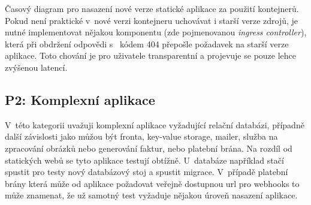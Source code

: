         \begin{iffigure}
            \centering
            \caption{Časový diagram pro nasazení nové verze statické aplikace za použití kontejnerů. Pokud není praktické v~nové verzi kontejneru uchovávat i starší verze zdrojů, je nutné implementovat nějakou komponentu (zde pojmenovanou \textit{ingress controller}), která při obdržení odpovědi s~ kódem 404 přepošle požadavek na starší verze aplikace. Toto chování je pro uživatele transparentní a projevuje se pouze lehce zvýšenou latencí.}
            \label{fig:static-deploy-container}
        \end{iffigure}

    \newpage
    \subsection{P2: Komplexní aplikace}
        V~této kategorii uvažuji komplexní aplikace vyžadující relační databázi, případně další závislosti jako můžou být fronta, key-value storage, mailer, služba na zpracování obrázků nebo generování faktur, nebo platební brána. Na rozdíl od statických webů se tyto aplikace testují obtížně.
        U~databáze například stačí spustit pro testy nový databázový stoj a spustit migrace. V~případě platební brány která může od aplikace požadovat veřejně dostupnou url pro webhooks to může znamenat, že už samotný test vyžaduje nějakou úroveň nasazení aplikace.

